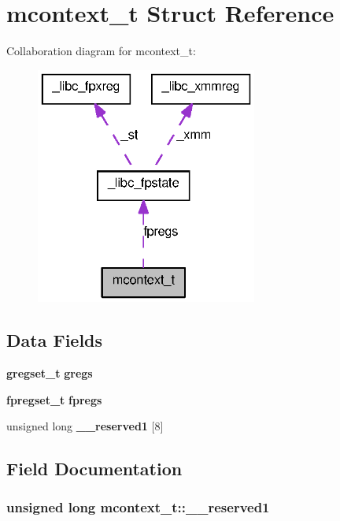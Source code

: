 \section{mcontext\_\-t Struct Reference}
\label{structmcontext__t}


Collaboration diagram for mcontext\_\-t:
\nopagebreak
\begin{figure}[H]
\begin{center}
\leavevmode
\includegraphics[width=206pt]{structmcontext__t__coll__graph}
\end{center}
\end{figure}
\subsection*{Data Fields}
\begin{DoxyCompactItemize}
\item 
{\bf gregset\_\-t} {\bf gregs}
\item 
{\bf fpregset\_\-t} {\bf fpregs}
\item 
unsigned long {\bf \_\-\_\-reserved1} [8]
\end{DoxyCompactItemize}


\subsection{Field Documentation}
\subsubsection[{\_\-\_\-reserved1}]{\setlength{\rightskip}{0pt plus 5cm}unsigned long {\bf mcontext\_\-t::\_\-\_\-reserved1}}\label{structmcontext__t_ae39e1cf58e2e3148fca1c18c9b0d0518}
